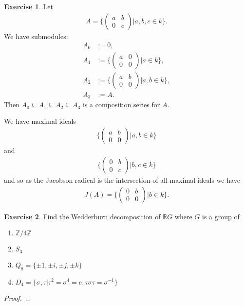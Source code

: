 \documentclass[12pt]{extarticle}
\newcommand{\set}[1]{\{#1\}}
\newcommand{\R}{\mathbb{R}}
\newcommand{\Z}{\mathbb{Z}}
\newcommand{\<}{\langle}
\renewcommand{\>}{\rangle}
\theoremstyle{definition}
\newtheorem{exercise}{Exercise}
\begin{document}
\begin{exercise}
  Let
  \begin{align*}
    A = \set{
      \begin{pmatrix}
        a & b \\
        0 & c 
      \end{pmatrix}
      |
      a,b,c \in k}.
  \end{align*}
  We have submodules:
  \begin{align*}
    A_0 &:= 0, \\
    A_1 &:= \set{
    \begin{pmatrix}
      a & 0 \\
      0 & 0
    \end{pmatrix}
    |
    a \in k
    }, \\
    A_2 &:= \set{
      \begin{pmatrix}
        a & b \\
        0 & 0
      \end{pmatrix}
      |
      a,b \in k
    }, \\
    A_3 &:= A.
  \end{align*}
  Then $A_0 \subseteq A_1 \subseteq A_2 \subseteq A_3$ is a composition series for $A$.

  We have maximal ideals
  \begin{align*}
    \set{
      \begin{pmatrix}
        a & b \\
        0 & 0
      \end{pmatrix}
      |
      a,b \in k
      }
  \end{align*}
  and
  \begin{align*}
    \set{
    \begin{pmatrix}
        0 & b \\
        0 & c
    \end{pmatrix}
    |
    b,c \in k
    }
  \end{align*}
  and so as the Jacobson radical is the intersection of all maximal ideals we have
  \begin{align*}
    J(A) =
    \set{
    \begin{pmatrix}
      0 & b \\
      0 & 0
    \end{pmatrix}
    |
    b \in k
    }.
  \end{align*}
\end{exercise}

\begin{exercise}
  Find the Wedderburn decomposition of $\R G$ where $G$ is a group of
  \begin{enumerate}
  \item
    $\Z / 4 \Z$
  \item
    $S_3$
  \item
    $Q_8 = \set{\pm 1, \pm i, \pm j, \pm k}$
  \item
    $D_4 = \set{ \sigma, \tau | \tau^2 = \sigma^4 = e, \tau \sigma \tau = \sigma^{-1}}$
  \end{enumerate}
\end{exercise}
\begin{proof}
  
\end{proof}
\end{document}
